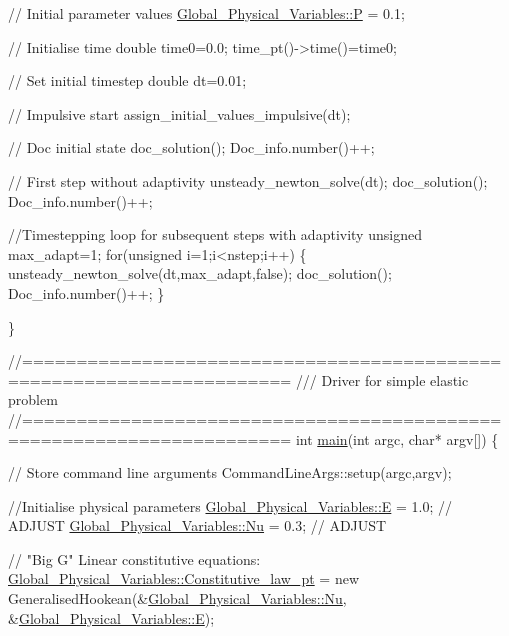 \begin{DoxyCodeInclude}
{{{{{{{{{ \textcolor{comment}{// Initial parameter values}
 \hyperlink{namespaceGlobal__Physical__Variables_a23c2ade6398f54040b869f7f3a2bcc4b}{Global\_Physical\_Variables::P} = 0.1; 

 \textcolor{comment}{// Initialise time}
 \textcolor{keywordtype}{double} time0=0.0;
 time\_pt()->time()=time0;

 \textcolor{comment}{// Set initial timestep}
 \textcolor{keywordtype}{double} dt=0.01; 

 \textcolor{comment}{// Impulsive start}
 assign\_initial\_values\_impulsive(dt); 
 
 \textcolor{comment}{// Doc initial state}
 doc\_solution();
 Doc\_info.number()++;

 \textcolor{comment}{// First step without adaptivity}
 unsteady\_newton\_solve(dt); 
 doc\_solution();
 Doc\_info.number()++;

 \textcolor{comment}{//Timestepping loop for subsequent steps with adaptivity}
 \textcolor{keywordtype}{unsigned} max\_adapt=1;
 \textcolor{keywordflow}{for}(\textcolor{keywordtype}{unsigned} i=1;i<nstep;i++)
  \{
   unsteady\_newton\_solve(dt,max\_adapt,\textcolor{keyword}{false});
   doc\_solution();
   Doc\_info.number()++;
  \}

\}





\textcolor{comment}{//======================================================================}\textcolor{comment}{}
\textcolor{comment}{/// Driver for simple elastic problem}
\textcolor{comment}{}\textcolor{comment}{//======================================================================}
\textcolor{keywordtype}{int} \hyperlink{shock__disk_8cc_a0ddf1224851353fc92bfbff6f499fa97}{main}(\textcolor{keywordtype}{int} argc, \textcolor{keywordtype}{char}* argv[])
\{

 \textcolor{comment}{// Store command line arguments}
 CommandLineArgs::setup(argc,argv);

 \textcolor{comment}{//Initialise physical parameters}
 \hyperlink{namespaceGlobal__Physical__Variables_a09a019474b7405b35da2437f7779bc7e}{Global\_Physical\_Variables::E} = 1.0; \textcolor{comment}{// ADJUST }
 \hyperlink{namespaceGlobal__Physical__Variables_a3962c36313826b19f216f6bbbdd6a477}{Global\_Physical\_Variables::Nu} = 0.3; \textcolor{comment}{// ADJUST}

  \textcolor{comment}{// "Big G" Linear constitutive equations:}
  \hyperlink{namespaceGlobal__Physical__Variables_a2a37fb040c832ee7a086bb13bb02a100}{Global\_Physical\_Variables::Constitutive\_law\_pt} = 
   \textcolor{keyword}{new} GeneralisedHookean(&\hyperlink{namespaceGlobal__Physical__Variables_a3962c36313826b19f216f6bbbdd6a477}{Global\_Physical\_Variables::Nu},
                          &\hyperlink{namespaceGlobal__Physical__Variables_a09a019474b7405b35da2437f7779bc7e}{Global\_Physical\_Variables::E});
 
}}}}}}}}}
\end{DoxyCodeInclude}
